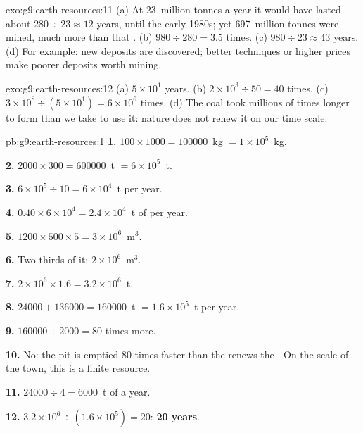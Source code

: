 \begin{solution}{exo:g9:earth-resources:11}
(a) At 23~million tonnes a year it would have lasted about $280 \div 23
\approx 12$ years, until the early 1980s; yet 697~million tonnes were mined,
much more than that . (b) $980 \div 280 = 3.5$ times. (c) $980 \div
23 \approx 43$ years. (d) For example: new deposits are discovered; better
techniques or higher prices make poorer deposits worth mining.
\end{solution}

\begin{solution}{exo:g9:earth-resources:12}
(a) $5 \times 10^1$ years. (b) $2 \times 10^3 \div 50 = 40$ times. (c) $3
\times 10^8 \div (5 \times 10^1) = 6 \times 10^6$ times. (d) The coal took
millions of times longer to form than we take to use it: nature does not
renew it on our time scale.
\end{solution}

\begin{solution}{pb:g9:earth-resources:1}
\textbf{1.} $100 \times 1000 = \num{100000}$~kg $= 1 \times 10^5$~kg.

\textbf{2.} $2000 \times 300 = \num{600000}$~t $= 6 \times 10^5$~t.

\textbf{3.} $6 \times 10^5 \div 10 = 6 \times 10^4$~t per year.

\textbf{4.} $0.40 \times 6 \times 10^4 = 2.4 \times 10^4$~t of  per
year.

\textbf{5.} $1200 \times 500 \times 5 = 3 \times 10^6$~m$^3$.

\textbf{6.} Two thirds of it: $2 \times 10^6$~m$^3$.

\textbf{7.} $2 \times 10^6 \times 1.6 = 3.2 \times 10^6$~t.

\textbf{8.} $\num{24000} + \num{136000} = \num{160000}$~t $= 1.6 \times
10^5$~t per year.

\textbf{9.} $\num{160000} \div 2000 = 80$ times more.

\textbf{10.} No: the pit is emptied 80 times faster than the 
renews the . On the scale of the town, this  is a finite resource.

\textbf{11.} $\num{24000} \div 4 = \num{6000}$~t of  a year.

\textbf{12.} $3.2 \times 10^6 \div (1.6 \times 10^5) = 20$: \textbf{20 years}.
\end{solution}
